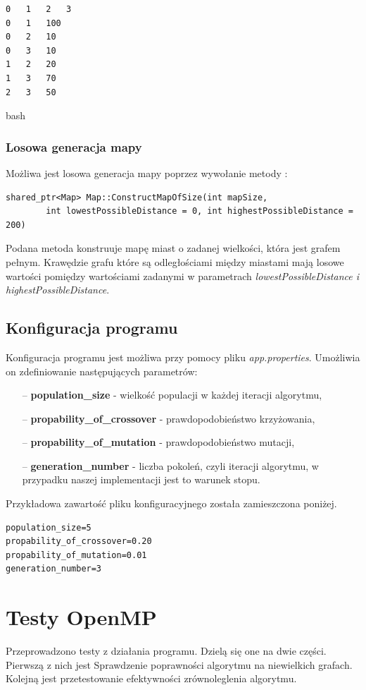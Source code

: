 \documentclass[10pt,a4paper]{article}
\begin{document}
\begin{verbatim}
0	1	2	3
0	1	100
0	2	10
0	3	10
1	2	20
1	3	70
2	3	50
\end{verbatim}{bash}
\subsubsection{Losowa generacja mapy}

Możliwa jest losowa generacja mapy poprzez wywołanie metody :
\begin{verbatim}
shared_ptr<Map> Map::ConstructMapOfSize(int mapSize,
		int lowestPossibleDistance = 0, int highestPossibleDistance = 200)
\end{verbatim}
Podana metoda konstruuje mapę miast o zadanej wielkości, która jest grafem pełnym. Krawędzie grafu które są odległościami między miastami mają losowe wartości pomiędzy wartościami zadanymi w parametrach  \textit{lowestPossibleDistance i highestPossibleDistance}. 

\subsection{Konfiguracja programu}
Konfiguracja programu jest możliwa przy pomocy pliku \textit{app.properties}. Umożliwia on zdefiniowanie następujących parametrów:
\begin{itemize}
\item[--] \textbf{population\_size} - wielkość populacji w każdej iteracji algorytmu,
\item[--] \textbf{propability\_of\_crossover} - prawdopodobieństwo krzyżowania,
\item[--] \textbf{propability\_of\_mutation} - prawdopodobieństwo mutacji,
\item[--] \textbf{generation\_number} - liczba pokoleń, czyli iteracji algorytmu, w przypadku naszej implementacji jest to warunek stopu.
\end{itemize}

Przykładowa zawartość pliku konfiguracyjnego została zamieszczona poniżej.
\begin{verbatim}
population_size=5
propability_of_crossover=0.20
propability_of_mutation=0.01
generation_number=3
\end{verbatim}
\section{Testy OpenMP}
Przeprowadzono testy z działania programu. Dzielą się one na dwie części. Pierwszą z nich jest Sprawdzenie poprawności algorytmu na niewielkich grafach. Kolejną jest przetestowanie efektywności zrównoleglenia algorytmu.
\end{document}
